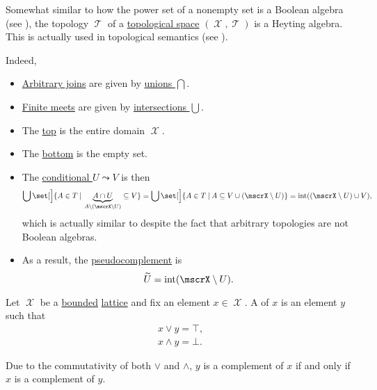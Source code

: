 \begin{example}\label{ex:topological_space_is_heyting_algebra}
  Somewhat similar to how the power set of a nonempty set is a Boolean algebra (see ), the topology \( \mscrT \) of a \hyperref[def:topological_space]{topological space} \( (\mscrX, \mscrT) \) is a Heyting algebra. This is actually used in topological semantics (see ).

  Indeed,
  \begin{itemize}
    \item \hyperref[def:semilattice/join]{Arbitrary joins} are given by \hyperref[def:basic_set_operations/union]{unions \( \bigcap \)}.
    \item \hyperref[def:semilattice/meet]{Finite meets} are given by \hyperref[def:basic_set_operations/intersection]{intersections \( \bigcup \)}.
    \item The \hyperref[def:semilattice/join]{top} is the entire domain \( \mscrX \).
    \item The \hyperref[def:semilattice/meet]{bottom} is the empty set.
    \item The \hyperref[eq:def:heyting_algebra/conditional]{conditional \( U \leadsto V \)} is then
    \begin{equation*}
      \bigcup\set[\Big]{ A \in T \given \underbrace{A \cap U}_{A \setminus (\mscrX \setminus U)} \subseteq V }
      =
      \bigcup\set[\Big]{ A \in T \given A \subseteq V \cup (\mscrX \setminus U) }
      =
      \inter((\mscrX \setminus U) \cup V),
    \end{equation*}
    which is actually similar to  despite the fact that arbitrary topologies are not Boolean algebras.

    \item As a result, the \hyperref[def:heyting_algebra/pseudocomplement]{pseudocomplement} is
    \begin{equation*}
      \widetilde U = \inter(\mscrX \setminus U).
    \end{equation*}
  \end{itemize}
\end{example}

\begin{definition}\label{def:bounded_lattice_complement}
  Let \( \mscrX \) be a \hyperref[def:semilattice/bounded]{bounded} \hyperref[def:semilattice/lattice]{lattice} and fix an element \( x \in \mscrX \). A  of \( x \) is an element \( y \) such that
  \begin{align}
    x \vee y = \top \label{def:bounded_lattice_complement/join}, \\
    x \wedge y = \bot \label{def:bounded_lattice_complement/meet}.
  \end{align}

  Due to the commutativity of both \( \vee \) and \( \wedge \), \( y \) is a complement of \( x \) if and only if \( x \) is a complement of \( y \).
\end{definition}

